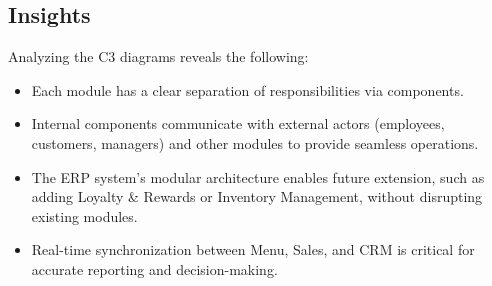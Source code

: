 \subsection*{Insights}

Analyzing the C3 diagrams reveals the following:

\begin{itemize}
    \item Each module has a clear separation of responsibilities via components.
    \item Internal components communicate with external actors (employees, customers, managers) and other modules to provide seamless operations.
    \item The ERP system’s modular architecture enables future extension, such as adding Loyalty \& Rewards or Inventory Management, without disrupting existing modules.
    \item Real-time synchronization between Menu, Sales, and CRM is critical for accurate reporting and decision-making.
\end{itemize}

